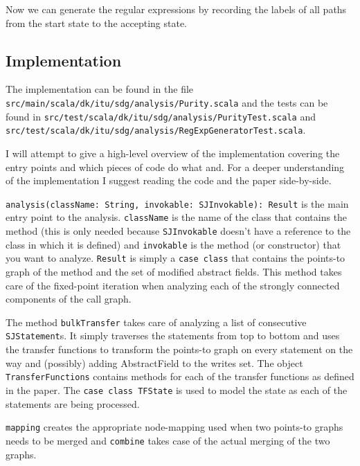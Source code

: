 \documentclass[11pt]{exam}
\begin{document}
Now we can generate the regular expressions by recording the labels of
all paths from the start state to the accepting state.

\subsection{Implementation}

The implementation can be found in the file \texttt{src/main/scala/dk/itu/sdg/analysis/Purity.scala} and the tests can be found in \texttt{src/test/scala/dk/itu/sdg/analysis/PurityTest.scala} and \texttt{src/test/scala/dk/itu/sdg/analysis/RegExpGeneratorTest.scala}. \newline

I will attempt to give a high-level overview of the implementation covering the entry points and which pieces of code do what and. For a deeper understanding of the implementation I suggest reading the code and the paper side-by-side. \newline

\texttt{analysis(className: String, invokable: SJInvokable): Result} is the main entry point to the analysis. \texttt{className} is the name of the class that contains the method (this is only needed because \texttt{SJInvokable} doesn't have a reference to the class in which it is defined) and \texttt{invokable} is the method (or constructor) that you want to analyze. \texttt{Result} is simply a \texttt{case class} that contains the points-to graph of the method and the set of modified abstract fields. This method takes care of the fixed-point iteration when analyzing each of the strongly connected components of the call graph. \newline

The method \texttt{bulkTransfer} takes care of analyzing a list of consecutive \texttt{SJStatement}s. It simply traverses the statements from top to bottom and uses the transfer functions to transform the points-to graph on every statement on the way and (possibly) adding AbstractField to the writes set. The object \texttt{TransferFunctions} contains methods for each of the transfer functions as defined in the paper. The \texttt{case class TFState} is used to model the state as each of the statements are being processed. \newline

\texttt{mapping} creates the appropriate node-mapping used when two points-to graphs needs to be merged and \texttt{combine} takes case of the actual merging of the two graphs. \newline
\end{document}
